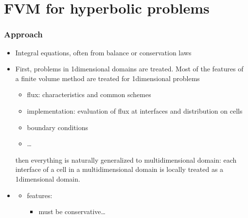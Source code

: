 \documentclass[letterpaper,10pt,english]{jupyterBook}
\begin{document}
\sphinxstepscope


\section{FVM for hyperbolic problems}
\label{\detokenize{ch/pde/fvm-hyperbolic-pde:fvm-for-hyperbolic-problems}}\label{\detokenize{ch/pde/fvm-hyperbolic-pde:pde-fvm-hyperbolic}}\label{\detokenize{ch/pde/fvm-hyperbolic-pde::doc}}\subsubsection*{Approach}
\begin{itemize}
\item {} 
\sphinxAtStartPar
Integral equations, often from balance or conservation laws

\item {} 
\sphinxAtStartPar
First, problems in 1\sphinxhyphen{}dimensional domains are treated. Most of the features of a finite volume method are treated for 1\sphinxhyphen{}dimensional problems
\begin{itemize}
\item {} 
\sphinxAtStartPar
flux: characteristics and common schemes

\item {} 
\sphinxAtStartPar
implementation: evaluation of flux at interfaces and distribution on cells

\item {} 
\sphinxAtStartPar
boundary conditions

\item {} 
\sphinxAtStartPar
…

\end{itemize}

\sphinxAtStartPar
then everything is naturally generalized to multi\sphinxhyphen{}dimensional domain: each interface of a cell in a multi\sphinxhyphen{}dimensional domain is locally treated as a 1\sphinxhyphen{}dimensional domain.

\item {} 
\sphinxAtStartPar
{\hyperref[\detokenize{ch/pde/fvm-hyperbolic-pde:pde-fvm-hyperbolic-flux}]{}}
\begin{itemize}
\item {} 
\sphinxAtStartPar
features:
\begin{itemize}
\item {} 
\sphinxAtStartPar
must be conservative…


\end{itemize}
\end{itemize}
\end{itemize}
\end{document}
